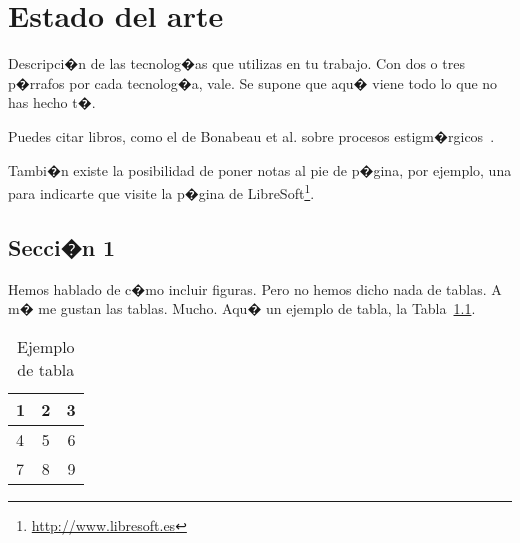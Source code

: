 \documentclass[a4paper, 12pt]{book}
\begin{document}
\cleardoublepage
\chapter{Estado del arte}

Descripci�n de las tecnolog�as que utilizas en tu trabajo.
Con dos o tres p�rrafos por cada tecnolog�a, vale.
Se supone que aqu� viene todo lo que no has hecho t�.

Puedes citar libros, como el de Bonabeau et al. sobre procesos estigm�rgicos~\cite{bonabeau:_swarm}. %

Tambi�n existe la posibilidad de poner notas al pie de p�gina, por ejemplo, una para indicarte que visite la p�gina de LibreSoft\footnote{\url{http://www.libresoft.es}}.

\section{Secci�n 1}
\label{sec:seccion1}

Hemos hablado de c�mo incluir figuras.
Pero no hemos dicho nada de tablas.
A m� me gustan las tablas.
Mucho.
Aqu� un ejemplo de tabla, la Tabla~\ref{tabla:ejemplo}.

\begin{table}
 \begin{center}
  \begin{tabular}{ | l | c | r |} %
    \hline
    1 & 2 & 3 \\ \hline %
    4 & 5 & 6 \\ \hline
    7 & 8 & 9 \\
    \hline
  \end{tabular}
  \label{tabla:ejemplo}
  \caption{Ejemplo de tabla}
 \end{center}
\end{table}




\cleardoublepage
\end{document}
